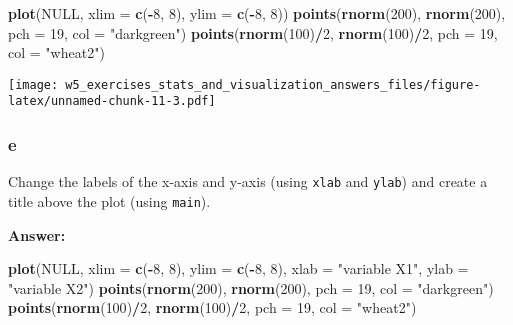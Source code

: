 \documentclass[]{article}
\newenvironment{Shaded}{\begin{snugshade}}{\end{snugshade}}
\newcommand{\DataTypeTok}[1]{\textcolor[rgb]{0.13,0.29,0.53}{#1}}
\newcommand{\DecValTok}[1]{\textcolor[rgb]{0.00,0.00,0.81}{#1}}
\newcommand{\KeywordTok}[1]{\textcolor[rgb]{0.13,0.29,0.53}{\textbf{#1}}}
\newcommand{\NormalTok}[1]{#1}
\newcommand{\OperatorTok}[1]{\textcolor[rgb]{0.81,0.36,0.00}{\textbf{#1}}}
\newcommand{\OtherTok}[1]{\textcolor[rgb]{0.56,0.35,0.01}{#1}}
\newcommand{\StringTok}[1]{\textcolor[rgb]{0.31,0.60,0.02}{#1}}
\begin{document}
\begin{Shaded}
\begin{Highlighting}[]
\KeywordTok{plot}\NormalTok{(}\OtherTok{NULL}\NormalTok{,  }\DataTypeTok{xlim =} \KeywordTok{c}\NormalTok{(}\OperatorTok{-}\DecValTok{8}\NormalTok{, }\DecValTok{8}\NormalTok{),  }\DataTypeTok{ylim =} \KeywordTok{c}\NormalTok{(}\OperatorTok{-}\DecValTok{8}\NormalTok{, }\DecValTok{8}\NormalTok{))}
\KeywordTok{points}\NormalTok{(}\KeywordTok{rnorm}\NormalTok{(}\DecValTok{200}\NormalTok{), }\KeywordTok{rnorm}\NormalTok{(}\DecValTok{200}\NormalTok{), }\DataTypeTok{pch =} \DecValTok{19}\NormalTok{, }\DataTypeTok{col =} \StringTok{"darkgreen"}\NormalTok{) }
\KeywordTok{points}\NormalTok{(}\KeywordTok{rnorm}\NormalTok{(}\DecValTok{100}\NormalTok{)}\OperatorTok{/}\DecValTok{2}\NormalTok{, }\KeywordTok{rnorm}\NormalTok{(}\DecValTok{100}\NormalTok{)}\OperatorTok{/}\DecValTok{2}\NormalTok{, }\DataTypeTok{pch =} \DecValTok{19}\NormalTok{, }\DataTypeTok{col =} \StringTok{"wheat2"}\NormalTok{)}
\end{Highlighting}
\end{Shaded}

\texttt{[image: w5\_exercises\_stats\_and\_visualization\_answers\_files/figure-latex/unnamed-chunk-11-3.pdf]}

\hypertarget{e}{%
\subsubsection{e}\label{e}}

Change the labels of the x-axis and y-axis (using \texttt{xlab} and
\texttt{ylab}) and create a title above the plot (using \texttt{main}).

\textbf{Answer:}

\begin{Shaded}
\begin{Highlighting}[]
\KeywordTok{plot}\NormalTok{(}\OtherTok{NULL}\NormalTok{,  }\DataTypeTok{xlim =} \KeywordTok{c}\NormalTok{(}\OperatorTok{-}\DecValTok{8}\NormalTok{, }\DecValTok{8}\NormalTok{),  }\DataTypeTok{ylim =} \KeywordTok{c}\NormalTok{(}\OperatorTok{-}\DecValTok{8}\NormalTok{, }\DecValTok{8}\NormalTok{), }\DataTypeTok{xlab =} \StringTok{"variable X1"}\NormalTok{, }\DataTypeTok{ylab =} \StringTok{"variable X2"}\NormalTok{)  }
\KeywordTok{points}\NormalTok{(}\KeywordTok{rnorm}\NormalTok{(}\DecValTok{200}\NormalTok{), }\KeywordTok{rnorm}\NormalTok{(}\DecValTok{200}\NormalTok{), }\DataTypeTok{pch =} \DecValTok{19}\NormalTok{, }\DataTypeTok{col =} \StringTok{"darkgreen"}\NormalTok{)}
\KeywordTok{points}\NormalTok{(}\KeywordTok{rnorm}\NormalTok{(}\DecValTok{100}\NormalTok{)}\OperatorTok{/}\DecValTok{2}\NormalTok{, }\KeywordTok{rnorm}\NormalTok{(}\DecValTok{100}\NormalTok{)}\OperatorTok{/}\DecValTok{2}\NormalTok{, }\DataTypeTok{pch =} \DecValTok{19}\NormalTok{, }\DataTypeTok{col =} \StringTok{"wheat2"}\NormalTok{)}
\end{Highlighting}
\end{Shaded}
\end{document}
